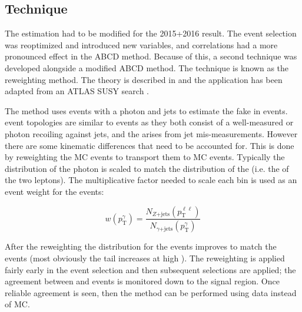 \subsection{\gjets Technique}
\label{sec:gjets}

The \Zjets estimation had to be modified for the 2015+2016 result. The event selection was reoptimized and introduced new variables, and correlations had a more pronounced effect in the ABCD method. Because of this, a second technique was developed alongside a modified ABCD method. The technique is known as the \gjets reweighting method. The theory is described in \cite{Ask:2011xf} and the application has been adapted from an ATLAS SUSY search \cite{Galster:2151990}.

The \gjets method uses events with a photon and jets to estimate the fake \etmiss in \Zjets events. \gjets event topologies are similar to \Zjets events as they both consist of a well-measured \Z or photon recoiling against jets, and the \etmiss arises from jet mis-measurements. However there are some kinematic differences that need to be accounted for. This is done by reweighting the \gjets MC events to transport them to \Zjets MC events. Typically the \pt distribution of the photon is scaled to match the \pt distribution of the \Z (i.e. the \pt of the two leptons). The multiplicative factor needed to scale each \pt bin is used as an event weight for the \gjets events: 

\begin{equation}
w(p_\text{T}^\gamma) = \frac{N_{Z\text{+jets}}(p_\text{T}^{\ell\ell})}{N_{\gamma\text{+jets}}(p_\text{T}^\gamma)}
\end{equation}

\noindent After the reweighting the \etmiss distribution for the \gjets events improves to match the \Zjets events (most obviously the tail increases at high \etmiss). The reweighting is applied fairly early in the event selection and then subsequent selections are applied; the agreement between \gjets and \Zjets events is monitored down to the signal region. Once reliable agreement is seen, then the method can be performed using data instead of MC.

